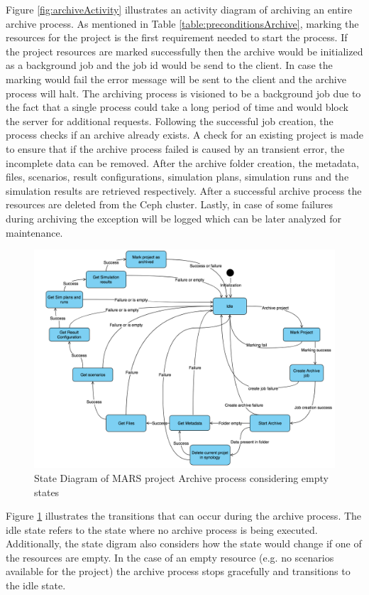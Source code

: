 Figure \ref{fig:archiveActivity} illustrates an activity diagram of archiving an entire archive process. As mentioned in Table \ref{table:preconditionsArchive},
marking the resources for the project is the first requirement needed to start the process. If the project resources are marked successfully
then the archive would be initialized as a background job and the job id would be send to the client. In case the marking would fail the error message will be 
sent to the client and the archive process will halt. The archiving process is visioned to be a background job due to the fact that a single process could take
a long period of time and would block the server for additional requests. Following the successful job creation, the process checks if an archive already
exists. A check for an existing project is made to ensure that if the archive process failed is caused by an transient error, the incomplete data can be removed. After
the archive folder creation, the metadata, files, scenarios, result configurations, simulation plans, simulation runs and the simulation results are retrieved respectively.
After a successful archive process the  resources are deleted from the Ceph cluster. Lastly, in case of some failures during archiving the exception will be logged 
which can be later analyzed for maintenance.

\begin{figure}[H]
    \centering \includegraphics[scale=0.45]{grafiken/stateArchive.png}
    \caption{State Diagram of MARS project Archive process considering empty states}
    \label{fig:stateArchive}
\end{figure}

Figure \ref{fig:stateArchive} illustrates the transitions that can occur during the archive process. The idle state refers to the state where no archive process
is being executed. Additionally, the state digram also considers
how the state would change if one of the resources are empty. In the case of an empty resource (e.g. no scenarios available for the project) the archive
process stops gracefully and transitions to the idle state. 

 